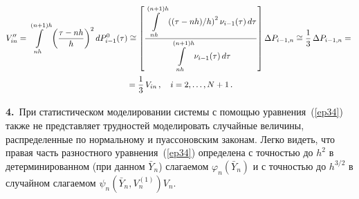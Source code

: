 {\vspace*{-12pt}

\noindent
\begin{multline*}
V_{in}''=\inh \left( \ovth\right)^2 dP_{i-1}^0(\tau)
    \cong \left[\fr{\inh \left((\tau-nh)/h\right)^2 \nu_{i-1}(\tau)\,d\tau}
    {\inh \nu_{i-1}(\tau)\,d\tau}\right]
    \Delta P_{i-1,n}\cong \fr{1}{3}\,\Delta P_{i-1,n}={}\\
    {}=
\fr{1}{3}\,V_{in}\,,\quad i=2,\ldots,N+1\,. %
\end{multline*}

\textbf{4.}\ При статистическом  моделировании системы с помощью уравнения~(\ref{ep34}) также не
представляет трудностей моделировать случайные величины,
распределенные по нормальному и пуассоновским законам.
Легко видеть, что правая часть разностного уравнения~(\ref{ep34})
определена с точностью до $h^2$ в детерминированном (при данном $\bar Y_n$)
слагаемом $\varphi_n(\bar Y_n)$ и с точностью до
$h^{3/2}$ в случайном слагаемом $\psi_n(\bar Y_n,V_n^{(1)})V_n$.

}
